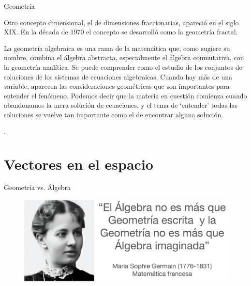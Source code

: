 \begin{myexampleblock}{Geometría}
\begin{footnotesize}
\vspace{2mm} Otro concepto dimensional, el de dimensiones fraccionarias, apareció en el siglo XIX. En la década de 1970 el concepto se desarrolló como la geometría fractal.


\vspace{2mm} La geometría algebraica es una rama de la matemática que, como sugiere su nombre, combina el álgebra abstracta, especialmente el álgebra conmutativa, con la geometría analítica. Se puede comprender como el estudio de los conjuntos de soluciones de los sistemas de ecuaciones algebraicas. Cuando hay más de una variable, aparecen las consideraciones geométricas que son importantes para entender el fenómeno. Podemos decir que la materia en cuestión comienza cuando abandonamos la mera solución de ecuaciones, y el tema de `entender' todas las soluciones se vuelve tan importante como el de encontrar alguna solución.

\vspace{2mm} 
.

\end{footnotesize}

\end{myexampleblock}






\chapter{Vectores en el espacio}
	


\begin{myblock}{Geometría vs. Álgebra}
	
	\begin{figure}[H]
		\centering
		\includegraphics[width=.9\textwidth]{imagenes/imagenes09/Sophie-Germain.png}
	\end{figure}

\end{myblock}



